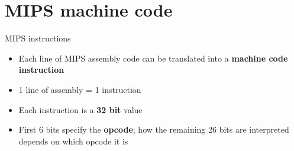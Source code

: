 \part{MIPS machine code}
\frame{\partpage}

\begin{frame}{MIPS instructions}
	\begin{itemize}
		\pause\item Each line of MIPS assembly code can be translated into a \textbf{machine code instruction}
		\pause\item 1 line of assembly = 1 instruction
		\pause\item Each instruction is a \textbf{32 bit} value
		\pause\item First 6 bits specify the \textbf{opcode}; how the remaining 26 bits are interpreted depends on which opcode it is
	\end{itemize}
\end{frame}

